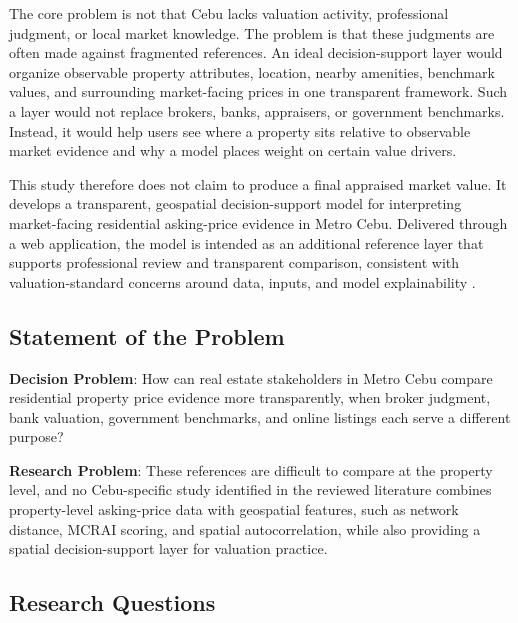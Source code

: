 The core problem is not that Cebu lacks valuation activity, professional judgment, or local market knowledge. The problem is that these judgments are often made against fragmented references. An ideal decision-support layer would organize observable property attributes, location, nearby amenities, benchmark values, and surrounding market-facing prices in one transparent framework. Such a layer would not replace brokers, banks, appraisers, or government benchmarks. Instead, it would help users see where a property sits relative to observable market evidence and why a model places weight on certain value drivers.

This study therefore does not claim to produce a final appraised market value. It develops a transparent, geospatial decision-support model for interpreting market-facing residential asking-price evidence in Metro Cebu. Delivered through a web application, the model is intended as an additional reference layer that supports professional review and transparent comparison, consistent with valuation-standard concerns around data, inputs, and model explainability \parencite{ivs2025}.


\subsection{Statement of the Problem}\label{statement-of-the-problem}

\textbf{Decision Problem}: How can real estate stakeholders in Metro Cebu compare residential property price evidence more transparently, when broker judgment, bank valuation, government benchmarks, and online listings each serve a different purpose?

\textbf{Research Problem}: These references are difficult to compare at the property level, and no Cebu-specific study identified in the reviewed literature combines property-level asking-price data with geospatial features, such as network distance, MCRAI scoring, and spatial autocorrelation, while also providing a spatial decision-support layer for valuation practice.


\subsection{Research Questions}\label{research-questions}

